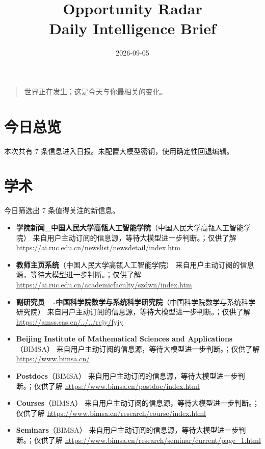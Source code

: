 \documentclass[11pt]{ctexart}
\title{Opportunity Radar\\Daily Intelligence Brief}
\date{2026-09-05}
\begin{document}
\maketitle
\begin{quote}\Large 世界正在发生；这是今天与你最相关的变化。\end{quote}
\section*{今日总览}
本次共有 7 条信息进入日报。未配置大模型密钥，使用确定性回退编辑。
\section*{学术}
今日筛选出 7 条值得关注的新信息。
\begin{itemize}
\item \textbf{学院新闻\_中国人民大学高瓴人工智能学院}（中国人民大学高瓴人工智能学院） 来自用户主动订阅的信息源，等待大模型进一步判断。；仅供了解 \url{https://ai.ruc.edu.cn/newslist/newsdetail/index.htm}
\item \textbf{教师主页系统}（中国人民大学高瓴人工智能学院） 来自用户主动订阅的信息源，等待大模型进一步判断。；仅供了解 \url{https://ai.ruc.edu.cn/academicfaculty/szdwn/index.htm}
\item \textbf{副研究员----中国科学院数学与系统科学研究院}（中国科学院数学与系统科学研究院） 来自用户主动订阅的信息源，等待大模型进一步判断。；仅供了解 \url{https://amss.cas.cn/../../rcjy/fyjy}
\item \textbf{Beijing Institute of Mathematical Sciences and Applications}（BIMSA） 来自用户主动订阅的信息源，等待大模型进一步判断。；仅供了解 \url{https://www.bimsa.cn/}
\item \textbf{Postdocs}（BIMSA） 来自用户主动订阅的信息源，等待大模型进一步判断。；仅供了解 \url{https://www.bimsa.cn/postdoc/index.html}
\item \textbf{Courses}（BIMSA） 来自用户主动订阅的信息源，等待大模型进一步判断。；仅供了解 \url{https://www.bimsa.cn/research/course/index.html}
\item \textbf{Seminars}（BIMSA） 来自用户主动订阅的信息源，等待大模型进一步判断。；仅供了解 \url{https://www.bimsa.cn/research/seminar/current/page_1.html}
\end{itemize}
\end{document}
